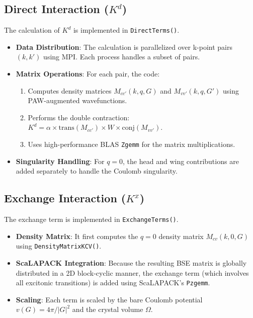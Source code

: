 \documentclass{article}
\begin{document}
\subsection{Direct Interaction ($K^d$)}
The calculation of $K^d$ is implemented in \texttt{DirectTerms()}.
\begin{itemize}
    \item \textbf{Data Distribution}: The calculation is parallelized over k-point pairs $(k, k')$ using MPI. Each process handles a subset of pairs.
    \item \textbf{Matrix Operations}: For each pair, the code:
    \begin{enumerate}
        \item Computes density matrices $M_{cc'}(k, q, G)$ and $M_{vv'}(k, q, G')$ using PAW-augmented wavefunctions.
        \item Performs the double contraction: $K^d = \alpha \times \text{trans}(M_{cc'}) \times W \times \text{conj}(M_{vv'})$.
        \item Uses high-performance BLAS \texttt{Zgemm} for the matrix multiplications.
    \end{enumerate}
    \item \textbf{Singularity Handling}: For $q=0$, the head and wing contributions are added separately to handle the Coulomb singularity.
\end{itemize}

\subsection{Exchange Interaction ($K^x$)}
The exchange term is implemented in \texttt{ExchangeTerms()}.
\begin{itemize}
    \item \textbf{Density Matrix}: It first computes the $q=0$ density matrix $M_{cv}(k, 0, G)$ using \texttt{DensityMatrixKCV()}.
    \item \textbf{ScaLAPACK Integration}: Because the resulting BSE matrix is globally distributed in a 2D block-cyclic manner, the exchange term (which involves all excitonic transitions) is added using ScaLAPACK's \texttt{Pzgemm}.
    \item \textbf{Scaling}: Each term is scaled by the bare Coulomb potential $v(G) = 4\pi/|G|^2$ and the crystal volume $\Omega$.
\end{itemize}
\end{document}
